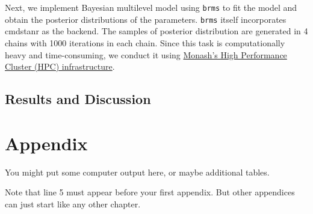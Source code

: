 \documentclass{monashthesis}
\begin{document}
Next, we implement Bayesian multilevel model using \texttt{brms} \autocite{brms} to fit the model and obtain the posterior distributions of the parameters. \texttt{brms} itself incorporates cmdstanr \autocite{cmdstanr} as the backend. The samples of posterior distribution are generated in 4 chains with 1000 iterations in each chain. Since this task is computationally heavy and time-consuming, we conduct it using \href{https://docs.monarch.erc.monash.edu/MonARCH/aboutMonArch.html}{Monash's High Performance Cluster (HPC) infrastructure}.

\hypertarget{results-and-discussion}{%
\section{Results and Discussion}\label{results-and-discussion}}

\appendix

\hypertarget{appendix}{%
\chapter{Appendix}\label{appendix}}

You might put some computer output here, or maybe additional tables.

Note that line 5 must appear before your first appendix. But other appendices can just start like any other chapter.

\printbibliography[heading=bibintoc]
\end{document}
